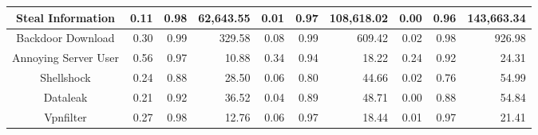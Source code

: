 \begin{table*}[!htb]
{\begin{tabular}{c|r|r|r|r|r|r|r|r|r}
Steal Information    & 0.11                                      & 0.98                                        & 62,643.55                                 & 0.01                                      & 0.97                                        & 108,618.02                                & 0.00                                      & 0.96                                        & 143,663.34                               \\ \hline
Backdoor Download    & 0.30                                      & 0.99                                        & 329.58                                    & 0.08                                      & 0.99                                        & 609.42                                    & 0.02                                      & 0.98                                        & 926.98                                   \\ \hline
Annoying Server User & 0.56                                      & 0.97                                        & 10.88                                     & 0.34                                      & 0.94                                        & 18.22                                     & 0.24                                      & 0.92                                        & 24.31                                    \\ \hline
Shellshock           & 0.24                                      & 0.88                                        & 28.50                                     & 0.06                                      & 0.80                                        & 44.66                                     & 0.02                                      & 0.76                                        & 54.99                                    \\ \hline
Dataleak             & 0.21                                      & 0.92                                        & 36.52                                     & 0.04                                      & 0.89                                        & 48.71                                     & 0.00                                      & 0.88                                        & 54.84                                    \\ \hline
Vpnfilter            & 0.27                                      & 0.98                                        & 12.76                                     & 0.06                                      & 0.97                                        & 18.44                                     & 0.01                                      & 0.97                                        & 21.41                                    \\ \hline

\end{tabular}}
\end{table*}
